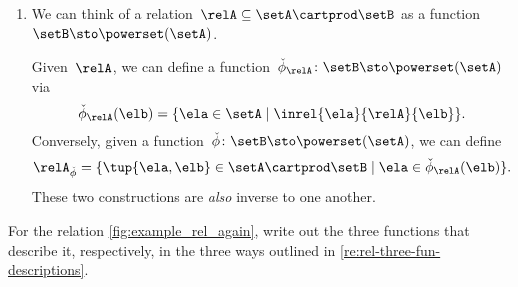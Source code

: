 \begin{remark}
\begin{enumerate}
        \item We can think of a relation~$\relA \subseteq \setA \cartprod \setB$ as a function~$\setB  \sto \powerset (\setA)$.
        
        Given~$\relA$, we can define a function~$\check \phi_{\relA} \colon \setB \sto \powerset (\setA)$ via
        \begin{equation}
            \check \phi_{\relA} (\elb) = \{ \ela \in \setA \mid \inrel{\ela}{\relA}{\elb}\}.
        \end{equation}
        Conversely, given a function~$\check \phi \colon \setB \sto \powerset (\setA)$, we can define
        \begin{equation}
            \relA_{\check \phi} = \{ \tup{\ela, \elb} \in \setA \cartprod \setB \mid \ela \in \check \phi_{\relA}(\elb)\}.
        \end{equation}
        These two constructions are \emph{also} inverse to one another.
    \end{enumerate}
\end{remark}

\begin{gradedexercise}
    \label{ex:Rel3Functions}
    For the relation \cref{fig:example_rel_again},
    write out the three functions that describe it, respectively, in the three ways outlined in \cref{re:rel-three-fun-descriptions}.
\end{gradedexercise}
\begin{marginfigure}
    \centering
    \caption{}
    \label{fig:example_rel_again}
\end{marginfigure}

